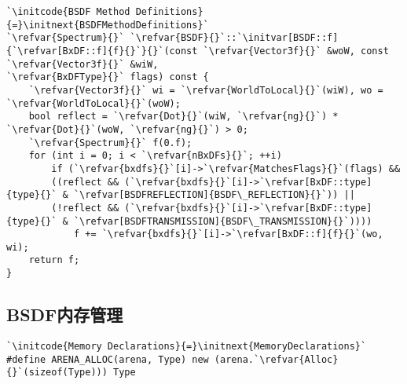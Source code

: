 \begin{lstlisting}
`\initcode{BSDF Method Definitions}{=}\initnext{BSDFMethodDefinitions}`
`\refvar{Spectrum}{}` `\refvar{BSDF}{}`::`\initvar[BSDF::f]{`\refvar[BxDF::f]{f}{}`}{}`(const `\refvar{Vector3f}{}` &woW, const `\refvar{Vector3f}{}` &wiW,
`\refvar{BxDFType}{}` flags) const {
    `\refvar{Vector3f}{}` wi = `\refvar{WorldToLocal}{}`(wiW), wo = `\refvar{WorldToLocal}{}`(woW);
    bool reflect = `\refvar{Dot}{}`(wiW, `\refvar{ng}{}`) * `\refvar{Dot}{}`(woW, `\refvar{ng}{}`) > 0;
    `\refvar{Spectrum}{}` f(0.f);
    for (int i = 0; i < `\refvar{nBxDFs}{}`; ++i)
        if (`\refvar{bxdfs}{}`[i]->`\refvar{MatchesFlags}{}`(flags) &&
        ((reflect && (`\refvar{bxdfs}{}`[i]->`\refvar[BxDF::type]{type}{}` & `\refvar[BSDFREFLECTION]{BSDF\_REFLECTION}{}`)) ||
        (!reflect && (`\refvar{bxdfs}{}`[i]->`\refvar[BxDF::type]{type}{}` & `\refvar[BSDFTRANSMISSION]{BSDF\_TRANSMISSION}{}`))))
            f += `\refvar{bxdfs}{}`[i]->`\refvar[BxDF::f]{f}{}`(wo, wi);
    return f;
}
\end{lstlisting}

\subsection{BSDF内存管理}\label{sub:BSDF内存管理}
\begin{lstlisting}
`\initcode{Memory Declarations}{=}\initnext{MemoryDeclarations}`
#define ARENA_ALLOC(arena, Type) new (arena.`\refvar{Alloc}{}`(sizeof(Type))) Type
\end{lstlisting}